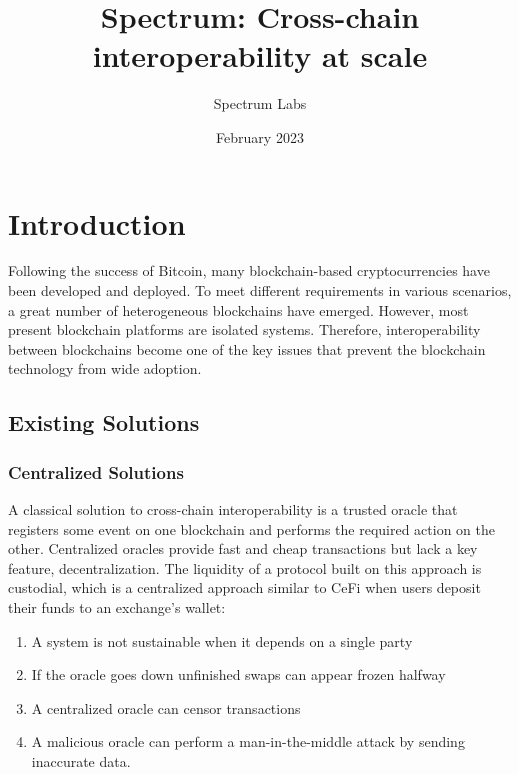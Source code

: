 \documentclass{article}
\title{Spectrum: Cross-chain interoperability at scale}
\author{Spectrum Labs}
\date{February 2023}
\begin{document}
    \pagecolor{SpectrumLavander}
    \begin{sloppypar}

        \maketitle


        \section{Introduction}\label{sec:introduction}

        Following the success of Bitcoin, many blockchain-based cryptocurrencies have been developed and deployed.
        To meet different requirements in various scenarios, a great number of heterogeneous blockchains have emerged.
        However, most present blockchain platforms are isolated systems.
        Therefore, interoperability between blockchains become one of the key issues
        that prevent the blockchain technology from wide adoption.

        \subsection{Existing Solutions}\label{subsec:existing-solutions}

        \subsubsection{Centralized Solutions}\label{subsubsec:centralized-solutions}

        A classical solution to cross-chain interoperability is a trusted oracle that registers some event on one blockchain and performs the required action on the other.
        Centralized oracles provide fast and cheap transactions but lack a key feature, decentralization.
        The liquidity of a protocol built on this approach is custodial, which is a centralized approach similar to CeFi when users deposit their funds to an exchange's wallet:
        \begin{enumerate}
            \item A system is not sustainable when it depends on a single party
            \item If the oracle goes down unfinished swaps can appear frozen halfway
            \item A centralized oracle can censor transactions
            \item A malicious oracle can perform a man-in-the-middle attack by sending inaccurate data.
        \end{enumerate}


\end{sloppypar}
\end{document}
